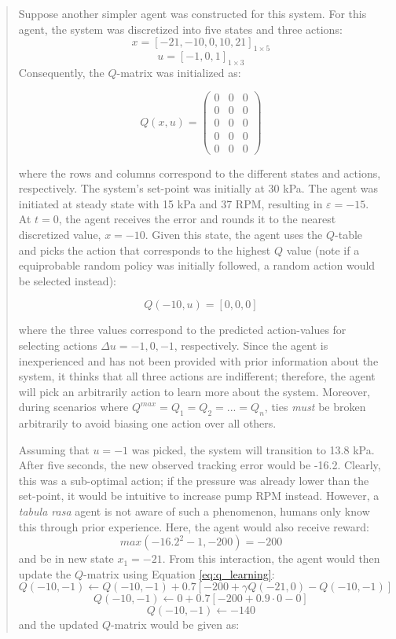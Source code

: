 \begin{quote}
    Suppose another simpler agent was constructed for this system. For this agent, the system was discretized into five states and three actions:
    $$x = [-21, -10, 0, 10, 21]_{1 \times 5}$$
    $$u = [-1, 0, 1]_{1 \times 3} $$
    Consequently, the $Q$-matrix was initialized as:
    
    $$ Q(x, u) = \left(\begin{matrix}   0 & 0 & 0 \\
                                        0 & 0 & 0 \\
                                        0 & 0 & 0 \\
                                        0 & 0 & 0 \\
                                        0 & 0 & 0 \end{matrix}\right) $$
    
    where the rows and columns correspond to the different states and actions, respectively. The system's set-point was initially at 30 kPa. The agent was initiated at steady state with 15 kPa and 37 RPM, resulting in $\varepsilon=-15$. At $t = 0$, the agent receives the error and rounds it to the nearest discretized value, $x = -10$.  Given this state, the agent uses the $Q$-table and picks the action that corresponds to the highest $Q$ value (note if a equiprobable random policy was initially followed, a random action would be selected instead):

        $$Q(-10, u) = [0, 0, 0]$$

    where the three values correspond to the predicted action-values for selecting actions $\Delta u = -1, 0, -1$, respectively. Since the agent is inexperienced and has not been provided with prior information about the system, it thinks that all three actions are indifferent; therefore, the agent will pick an arbitrarily action to learn more about the system. Moreover, during scenarios where $Q^{max} = Q_1 = Q_2 = ... = Q_n$, ties \textit{must} be broken arbitrarily to avoid biasing one action over all others.
    
    Assuming that $u = -1$ was picked, the system will transition to 13.8 kPa. After five seconds, the new observed tracking error would be -16.2. Clearly, this was a sub-optimal action; if the pressure was already lower than the set-point, it would be intuitive to increase pump RPM instead. However, a \textit{tabula rasa} agent is not aware of such a phenomenon, humans only know this through prior experience. Here, the agent would also receive reward:
    $$max(-16.2^2 - 1, -200) = -200$$ 
    and be in new state $x_1 = -21$.  From this interaction, the agent would then update the $Q$-matrix using Equation \ref{eq:q_learning}:
    $$Q(-10, -1) \leftarrow Q(-10, -1) + 0.7 [-200 + \gamma Q(-21, 0) - Q(-10, -1)]$$
    $$Q(-10, -1) \leftarrow 0 + 0.7 [-200 + 0.9 \cdot 0 - 0]$$
    $$Q(-10, -1) \leftarrow -140 $$
    and the updated $Q$-matrix would be given as:
    

\end{quote}

